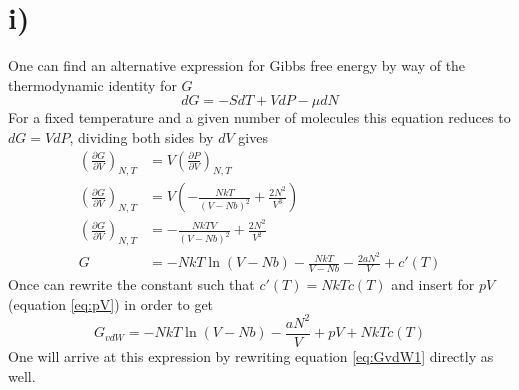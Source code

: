 \documentclass{article}
\begin{document}
\section*{i)}
One can find an alternative expression for Gibbs free energy by way of the thermodynamic identity for $G$
\begin{equation}
dG = -SdT + VdP - \mu dN
\end{equation}
For a fixed temperature and a given number of molecules this equation reduces to $dG = VdP$, dividing both sides by $dV$ gives
\begin{align*}
\left(\frac{\partial G}{\partial V}\right)_{N,T} &= V \left(\frac{\partial P}{\partial V} \right)_{N,T} \\
\left(\frac{\partial G}{\partial V}\right)_{N,T} &= V \left(-\frac{NkT}{(V-Nb)^2} + \frac{2N^2}{V^3} \right) \\
\left(\frac{\partial G}{\partial V}\right)_{N,T} &= -\frac{NkTV}{(V-Nb)^2} + \frac{2N^2}{V^2} \\
G &= -NkT \ln (V-Nb) - \frac{NkT}{V-Nb} - \frac{2aN^2}{V} + c'(T)
\end{align*}
Once can rewrite the constant such that $c'(T) = NkTc(T)$ and insert for $pV$ (equation \ref{eq:pV}) in order to get
\begin{equation}
\label{eq:GvdW2}
G_{vdW} = -NkT\ln (V-Nb) - \frac{aN^2}{V} + pV + NkTc(T)
\end{equation}
One will arrive at this expression by rewriting equation \ref{eq:GvdW1} directly as well.
\end{document}
